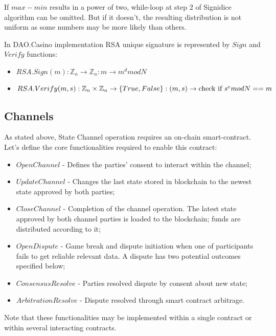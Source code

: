 \begin{remark}
If  $max -  min$  results in a power of two, while-loop at step 2 of Signidice algorithm can be omitted. But if it doesn’t, the resulting distribution is not uniform as some numbers may be more likely than others.
\end{remark}

In DAO.Casino implementation RSA unique signature is represented by $Sign$ and $Verify$ functions:
\begin{itemize}
	\item $RSA.Sign(m): \mathbb{Z}_n \rightarrow \mathbb{Z}_n: m \rightarrow m^d mod N$
	\item $RSA.Verify(m, s): \mathbb{Z}_n \times \mathbb{Z}_n \rightarrow \{True, False\}: (m, s) \rightarrow \text{check if } \\ s^e mod N == m $
\end{itemize}

	\subsection{Channels}
As stated above, State Channel operation requires an on-chain smart-contract. Let’s define the core functionalities required to enable this contract:
\begin{itemize}
	\item $ OpenChannel $ - Defines the parties’ consent to interact within the channel;
	\item $ UpdateChannel $ - Changes the last state stored in blockchain to the newest state approved by both parties;
	\item $ CloseChannel $ - Completion of the channel operation. The latest state approved by both channel parties is loaded to the blockchain; funds are distributed according to it;
	\item $ OpenDispute $ - Game break and dispute initiation when one of participants fails to get reliable relevant data. A dispute has two potential outcomes specified below;
	\item $ ConsensusResolve $ - Parties resolved dispute by consent about new state;
	\item $ ArbitrationResolve $ - Dispute resolved through smart contract arbitrage.
\end{itemize}

\begin{remark}
Note that these functionalities may be implemented within a single contract or within several interacting contracts.
\end{remark}


